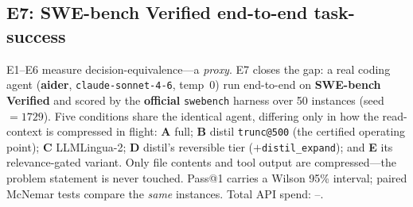 \documentclass{article}
\newcommand{\sweEsevenN}{50}\newcommand{\sweEsevenSeed}{1729}%
\newcommand{\sweEsevenTotalCost}{--}}
\begin{document}
\subsection{E7: SWE-bench Verified end-to-end task-success}
\label{sec:e7}

E1--E6 measure decision-equivalence---a \emph{proxy}. E7 closes the gap: a real coding
agent (\textbf{aider}, \texttt{claude-sonnet-4-6}, temp~0) run end-to-end on \textbf{SWE-bench
Verified} and scored by the \textbf{official} \texttt{swebench} harness over \sweEsevenN{}
instances (seed~$=\sweEsevenSeed{}$). Five conditions share the identical agent, differing only
in how the read-context is compressed in flight: \textbf{A} full; \textbf{B} distil
\texttt{trunc@500} (the certified operating point); \textbf{C} LLMLingua-2; \textbf{D} distil's
reversible tier ($+$\texttt{distil\_expand}); and \textbf{E} its relevance-gated variant. Only
file contents and tool output are compressed---the problem statement is never touched. Pass@1
carries a Wilson 95\% interval; paired McNemar tests compare the \emph{same} instances. Total
API spend: \sweEsevenTotalCost{}.
\end{document}
